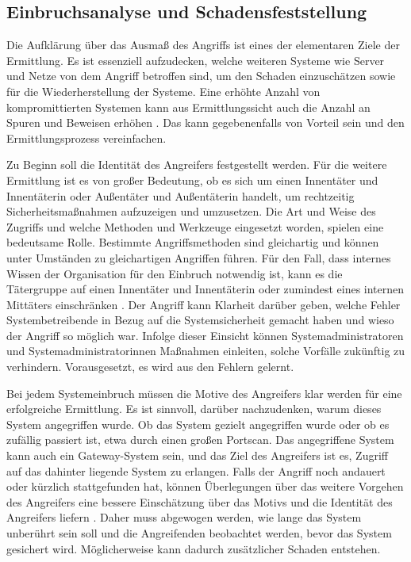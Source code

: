 \documentclass[12pt,DIV=14, version=first, BCOR=10mm,a4paper,twoside,parskip=half-,headsepline,headinclude]{scrartcl}
\begin{document}
    \subsection{Einbruchsanalyse und Schadensfeststellung}
    Die Aufklärung über das Ausmaß des Angriffs ist eines der elementaren Ziele der Ermittlung. Es ist essenziell aufzudecken, welche weiteren Systeme wie Server und Netze von dem Angriff betroffen sind, um den Schaden einzuschätzen sowie für die Wiederherstellung der Systeme. Eine erhöhte Anzahl von kompromittierten Systemen kann aus Ermittlungssicht auch die Anzahl an Spuren und Beweisen erhöhen \cite[vgl. S. 70]{texbook01}. Das kann gegebenenfalls von Vorteil sein und den Ermittlungsprozess vereinfachen.
    
    Zu Beginn soll die Identität des Angreifers festgestellt werden. Für die weitere Ermittlung ist es von großer Bedeutung, ob es sich um einen Innentäter und Innentäterin oder Außentäter und Außentäterin handelt, um rechtzeitig Sicherheitsmaßnahmen aufzuzeigen und umzusetzen. Die Art und Weise des Zugriffs und welche Methoden und Werkzeuge eingesetzt worden, spielen eine bedeutsame Rolle. Bestimmte Angriffsmethoden sind gleichartig und können unter Umständen zu gleichartigen Angriffen führen. Für den Fall, dass internes Wissen der Organisation für den Einbruch notwendig ist, kann es die Tätergruppe auf einen Innentäter und Innentäterin oder zumindest eines internen Mittäters einschränken \cite[vgl. S. 29]{BSI_leitfaden}. Der Angriff kann Klarheit darüber geben, welche Fehler Systembetreibende in Bezug auf die Systemsicherheit gemacht haben und wieso der Angriff so möglich war. Infolge dieser Einsicht können Systemadministratoren und Systemadministratorinnen Maßnahmen einleiten, solche Vorfälle zukünftig zu verhindern. Vorausgesetzt, es wird aus den Fehlern gelernt.
    
    Bei jedem Systemeinbruch müssen die Motive des Angreifers klar werden für eine erfolgreiche Ermittlung. Es ist sinnvoll, darüber nachzudenken, warum dieses System angegriffen wurde. Ob das System gezielt angegriffen wurde oder ob es zufällig passiert ist, etwa durch einen großen Portscan. Das angegriffene System kann auch ein Gateway-System sein, und das Ziel des Angreifers ist es, Zugriff auf das dahinter liegende System zu erlangen. Falls der Angriff noch andauert oder kürzlich stattgefunden hat, können Überlegungen über das weitere Vorgehen des Angreifers eine bessere Einschätzung über das Motivs und die Identität des Angreifers liefern \cite[vgl. S. 70-72]{texbook01}. Daher muss abgewogen werden, wie lange das System unberührt sein soll und die Angreifenden beobachtet werden, bevor das System gesichert wird. Möglicherweise kann dadurch zusätzlicher Schaden entstehen.
    
\end{document}
